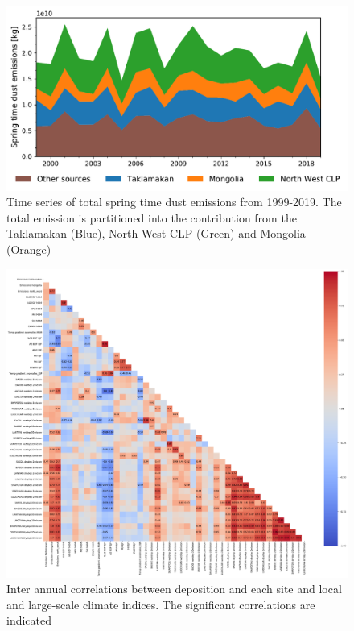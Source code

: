 \begin{figure}
    \centering
    \includegraphics[width=\textwidth]{../figs/Emission_timeseries.pdf}
    \caption{Time series of total spring time dust emissions from 1999-2019. The total emission is partitioned into the contribution from the Taklamakan (Blue), North West CLP (Green) and Mongolia (Orange) }
    \label{fig:emission_timeseries}
\end{figure}



\begin{figure}
    \centering
    \includegraphics[width=\textwidth]{../figs/correlations.pdf}
    \caption{Inter annual correlations between deposition and each site and local and large-scale climate indices. The significant correlations are indicated}
    \label{fig:correlations}
\end{figure}

